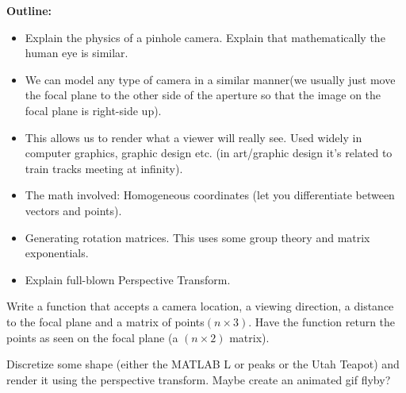 

{\bf Outline:}

\begin{itemize}
\item Explain the physics of a pinhole camera. Explain that mathematically the human eye is similar.
\item We can model any type of camera in a similar manner(we usually just move the focal plane to the other side of the aperture so that the image on the focal plane is right-side up).
\item This allows us to render what a viewer will really see. Used widely in computer graphics, graphic design etc. (in art/graphic design it's related to train tracks meeting at infinity).
\item The math involved: Homogeneous coordinates (let you differentiate between vectors and points).
\item Generating rotation matrices. This uses some group theory and matrix exponentials.
\item Explain full-blown Perspective Transform.
\end{itemize}

\begin{problem}
Write a function that accepts a camera location, a viewing direction, a distance to the focal plane and a matrix of points$(n\times 3)$. Have the function return the points as seen on the focal plane (a $(n\times 2)$ matrix).
\end{problem}

\begin{problem}
Discretize some shape (either the MATLAB L or peaks or the Utah Teapot) and render it using the perspective transform. Maybe create an animated gif flyby?
\end{problem}

